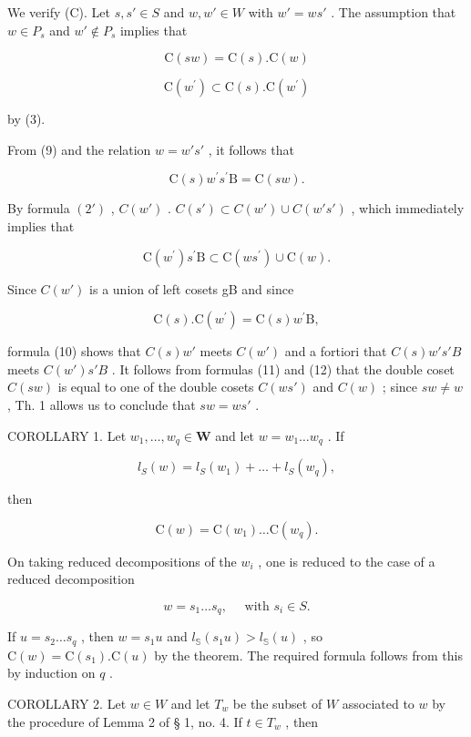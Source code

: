 We verify (C). Let \(s, s' \in S\) and \(w, w' \in W\) with \(w' = ws'\) . The assumption that \(w \in P_s\) and \(w' \notin P_s\) implies that

\[
\mathrm{C} (s w) = \mathrm{C} (s). \mathrm{C} (w)\tag{9}
\]

\[
\mathrm{C} (w ^ {\prime}) \subset \mathrm{C} (s). \mathrm{C} (w ^ {\prime})\tag{10}
\]

by (3).

From (9) and the relation \(w = w's'\) , it follows that

\[
\mathrm{C} (s) w ^ {\prime} s ^ {\prime} \mathrm{B} = \mathrm{C} (s w).\tag{11}
\]

By formula \((2')\) , \(C(w')\) . \(C(s') \subset C(w') \cup C(w's')\) , which immediately implies that

\[
\mathrm{C} (w ^ {\prime}) s ^ {\prime} \mathrm{B} \subset \mathrm{C} (w s ^ {\prime}) \cup \mathrm{C} (w).\tag{12}
\]

Since \(C(w')\) is a union of left cosets gB and since

\[
\mathrm{C} (s). \mathrm{C} (w ^ {\prime}) = \mathrm{C} (s) w ^ {\prime} \mathrm{B},
\]

formula (10) shows that \(C(s)w'\) meets \(C(w')\) and a fortiori that \(C(s)w's'B\) meets \(C(w')s'B\) . It follows from formulas (11) and (12) that the double coset \(C(sw)\) is equal to one of the double cosets \(C(ws')\) and \(C(w)\) ; since \(sw \neq w\) , Th. 1 allows us to conclude that \(sw = ws'\) .

COROLLARY 1. Let \(w_{1}, \ldots, w_{q} \in \mathbf{W}\) and let \(w = w_{1} \ldots w_{q}\) . If

\[
l _ {S} (w) = l _ {S} \left(w _ {1}\right) + \dots + l _ {S} \left(w _ {q}\right),
\]

then

\[
\mathrm{C} (w) = \mathrm{C} (w _ {1}) \dots \mathrm{C} (w _ {q}).
\]

On taking reduced decompositions of the \(w_{i}\) , one is reduced to the case of a reduced decomposition

\[
w = s _ {1} \dots s _ {q}, \quad \text { with } s _ {i} \in S.
\]

If \(u = s_2 \ldots s_q\) , then \(w = s_1u\) and \(l_{\mathbb{S}}(s_1u) > l_{\mathbb{S}}(u)\) , so \(\mathrm{C}(w) = \mathrm{C}(s_1). \mathrm{C}(u)\) by the theorem. The required formula follows from this by induction on \(q\) .

COROLLARY 2. Let \(w \in W\) and let \(T_w\) be the subset of \(W\) associated to \(w\) by the procedure of Lemma 2 of § 1, no. 4. If \(t \in T_w\) , then

